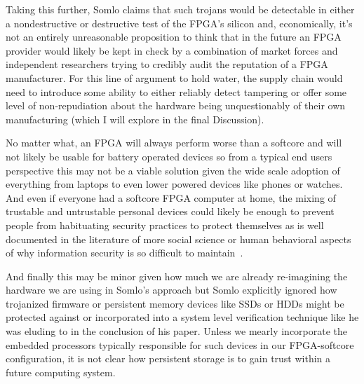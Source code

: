 \documentclass[conference]{IEEEtran}
\begin{document}
Taking this further, Somlo claims  that such trojans would be detectable in either a nondestructive or destructive test of the FPGA’s silicon and, economically, it’s not an entirely unreasonable proposition to think that in the future an FPGA provider would likely be kept in check by a combination of market forces and independent researchers trying to credibly audit the reputation of a FPGA manufacturer. For this line of argument to hold water, the supply chain would need to introduce some ability to either reliably detect tampering or offer some level of non-repudiation about the hardware being unquestionably of their own manufacturing (which I will explore in the final Discussion).

No matter what, an FPGA will always perform worse than a softcore and will not likely be usable for battery operated devices so from a typical end users perspective this may not be a viable solution given the wide scale adoption of everything from laptops to even lower powered devices like phones or watches. And even if everyone had a softcore FPGA computer at home,  the mixing of trustable and untrustable personal devices could likely be enough to prevent people from habituating security practices to protect themselves as is well documented in the literature of more social science or human behavioral aspects of why information security is so difficult to maintain~\cite{anderson}.

And finally this may be minor given how much we are already re-imagining the hardware we are using in Somlo’s approach but Somlo explicitly ignored how trojanized firmware or persistent memory devices like SSDs or HDDs might be protected against or incorporated into a system level verification technique like he was eluding to in the conclusion of his paper. Unless we mearly incorporate the embedded processors typically responsible for such devices in our FPGA-softcore configuration, it is not clear how persistent storage is to gain trust within a future computing system.
\end{document}
